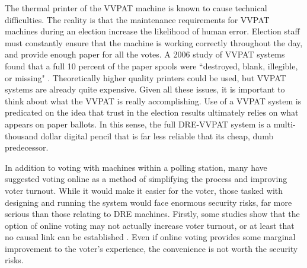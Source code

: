 \documentclass[12pt, titlepage]{article}
\begin{document}
The thermal printer of the VVPAT machine is known to cause technical difficulties. The reality is that the maintenance requirements for VVPAT machines during an election increase the likelihood of human error. Election staff must constantly ensure that the machine is working correctly throughout the day, and provide enough paper for all the votes. A 2006 study of VVPAT systems found that a full 10 percent of the paper spools were ``destroyed, blank, illegible, or missing" \cite{goggin2007examination}. Theoretically higher quality printers could be used, but VVPAT systems are already quite expensive. Given all these issues, it is important to think about what the VVPAT is really accomplishing. Use of a VVPAT system is predicated on the idea that trust in the election results ultimately relies on what appears on paper ballots. In this sense, the full DRE-VVPAT system is a multi-thousand dollar digital pencil that is far less reliable that its cheap, dumb predecessor.

In addition to voting with machines within a polling station, many have suggested voting online as a method of simplifying the process and improving voter turnout. While it would make it easier for the voter, those tasked with designing and running the system would face enormous security risks, far more serious than those relating to DRE machines. Firstly, some studies show that the option of online voting may not actually increase voter turnout, or at least that no causal link can be established \cite{germann2017internet} \cite{estonianturnout}. Even if online voting provides some marginal improvement to the voter's experience, the convenience is not worth the security risks. 
\end{document}
